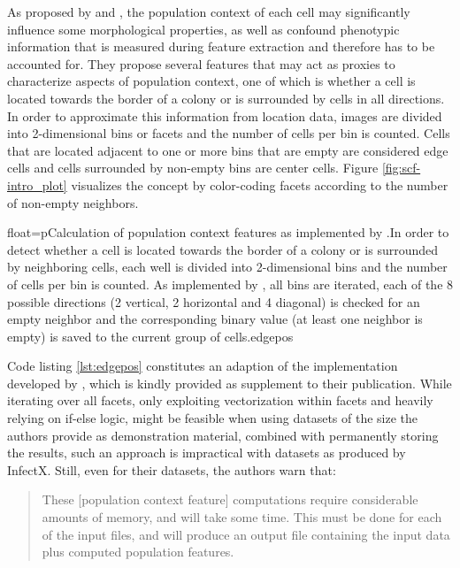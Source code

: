 \label{ex:efficiency}
As proposed by \citet{Knapp2011} and \citet{Snijder2012}, the population context of each cell may significantly influence some morphological properties, as well as confound phenotypic information that is measured during feature extraction and therefore has to be accounted for. They propose several features that may act as proxies to characterize aspects of population context, one of which is whether a cell is located towards the border of a colony or is surrounded by cells in all directions. In order to approximate this information from location data, images are divided into 2-dimensional bins or facets and the number of cells per bin is counted. Cells that are located adjacent to one or more bins that are empty are considered edge cells and cells surrounded by non-empty bins are center cells. Figure \ref{fig:scf-intro_plot} visualizes the concept by color-coding facets according to the number of non-empty neighbors.

\begin{rlisting}{float=p}{Calculation of population context features as implemented by \citeauthor{Knapp2011}.}{In order to detect whether a cell is located towards the border of a colony or is surrounded by neighboring cells, each well is divided into 2-dimensional bins and the number of cells per bin is counted. As implemented by \citeauthor{Knapp2011}, all bins are iterated, each of the 8 possible directions (2 vertical, 2 horizontal and 4 diagonal) is checked for an empty neighbor and the corresponding binary value (at least one neighbor is empty) is saved to the current group of cells.}{edgepos}

\end{rlisting}

Code listing \ref{lst:edgepos} constitutes an adaption of the implementation developed by \citeauthor{Knapp2011}, which is kindly provided as supplement to their publication. While iterating over all facets, only exploiting vectorization within facets and heavily relying on if-else logic, might be feasible when using datasets of the size the authors provide as demonstration material, combined with permanently storing the results, such an approach is impractical with datasets as produced by InfectX. Still, even for their datasets, the authors warn that:

\begin{quote}
These [population context feature] computations require considerable amounts of memory, and will take some time. This must be done for each of the input files, and will produce an output file containing the input data plus computed population features.
\end{quote}

